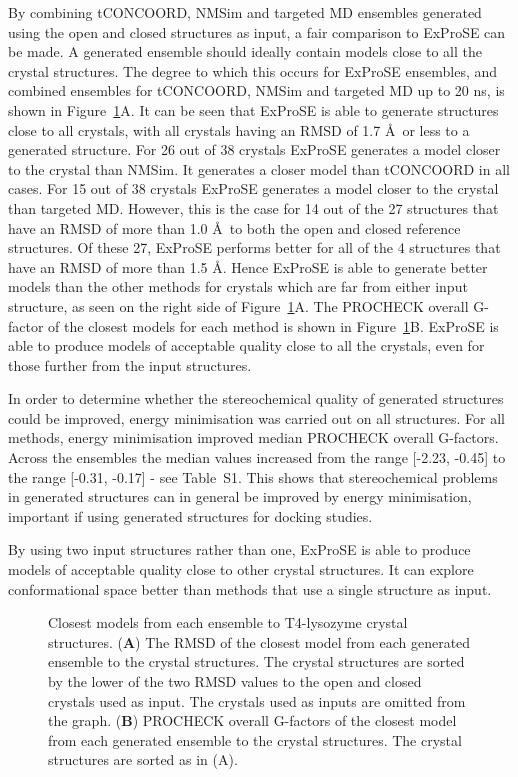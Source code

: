 By combining tCONCOORD, NMSim and targeted MD ensembles generated using the open and closed structures as input, a fair comparison to ExProSE can be made.
A generated ensemble should ideally contain models close to all the crystal structures.
The degree to which this occurs for ExProSE ensembles, and combined ensembles for tCONCOORD, NMSim and targeted MD up to 20 ns, is shown in Figure~\ref{fig:t4l_rmsd}A.
It can be seen that ExProSE is able to generate structures close to all crystals, with all crystals having an RMSD of 1.7 \AA\ or less to a generated structure.
For 26 out of 38 crystals ExProSE generates a model closer to the crystal than NMSim.
It generates a closer model than tCONCOORD in all cases.
For 15 out of 38 crystals ExProSE generates a model closer to the crystal than targeted MD.
However, this is the case for 14 out of the 27 structures that have an RMSD of more than 1.0 \AA\ to both the open and closed reference structures.
Of these 27, ExProSE performs better for all of the 4 structures that have an RMSD of more than 1.5 \AA.
Hence ExProSE is able to generate better models than the other methods for crystals which are far from either input structure, as seen on the right side of Figure~\ref{fig:t4l_rmsd}A.
The PROCHECK overall G-factor of the closest models for each method is shown in Figure~\ref{fig:t4l_rmsd}B.
ExProSE is able to produce models of acceptable quality close to all the crystals, even for those further from the input structures.

In order to determine whether the stereochemical quality of generated structures could be improved, energy minimisation was carried out on all structures.
For all methods, energy minimisation improved median PROCHECK overall G-factors.
Across the ensembles the median values increased from the range [-2.23, -0.45] to the range [-0.31, -0.17] - see Table~S1.
This shows that stereochemical problems in generated structures can in general be improved by energy minimisation, important if using generated structures for docking studies.

By using two input structures rather than one, ExProSE is able to produce models of acceptable quality close to other crystal structures.
It can explore conformational space better than methods that use a single structure as input.


\begin{figure}
\centering


\caption{Closest models from each ensemble to T4-lysozyme crystal structures.
(\textbf{A}) The RMSD of the closest model from each generated ensemble to the crystal structures.
The crystal structures are sorted by the lower of the two RMSD values to the open and closed crystals used as input.
The crystals used as inputs are omitted from the graph.
(\textbf{B}) PROCHECK overall G-factors of the closest model from each generated ensemble to the crystal structures.
The crystal structures are sorted as in (A).}

\label{fig:t4l_rmsd}
\end{figure}


